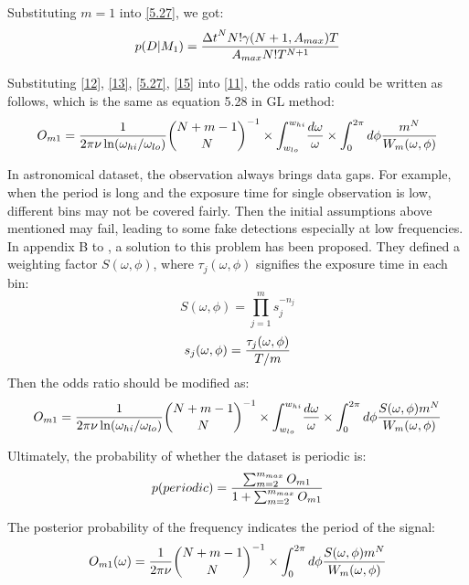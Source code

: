\documentclass[twoside,twocolumn]{aastex63}
\begin{document}
Substituting $m=1$ into \ref{5.27}, we got:
\begin{equation}\label{15}
p(D|M_1)={{{\Delta t}^N N!\gamma(N+1,A_{max})T}\over {A_{max}N!T^{N+1}}}
\end{equation}

Substituting \ref{12}, \ref{13}, \ref{5.27}, \ref{15} into \ref{11}, the odds ratio could be written as follows, which is the same as equation 5.28 in GL method:
\begin{equation}\label{A16}
O_{m1}={1\over{2\pi \nu \ln(\omega_{hi}/\omega_{lo})}} {{N+m-1}	\choose N}^{-1}\times {\int_{w_{lo}}^{w_{hi}}}{{d\omega}\over{\omega}}\times {\int_0^{2\pi}d\phi{m^N\over W_m(\omega,\phi)}} 
\end{equation}

In astronomical dataset, the observation always brings data gaps. For example, when the period is long and the exposure time for single observation is low, different bins may not be covered fairly. Then the initial assumptions above mentioned may fail, leading to some fake detections especially at low frequencies. In appendix B to \citep{1992ApJ...398..146G}, a solution to this problem has been proposed. They defined a weighting factor $S(\omega,\phi)$, where ${\tau_{j}(\omega,\phi)}$ signifies the exposure time in each bin:
\begin{equation}\label{A17}
S(\omega,\phi)={\prod_{j=1}^m s_j^{-n_j}}
\end{equation}
\begin{equation}
s_j(\omega,\phi)={{\tau_{j}(\omega,\phi)}\over {T/m}}
\end{equation}
\indent
Then the odds ratio should be modified as:
\begin{equation}\label{A19}
O_{m1}={1\over{2\pi \nu \ln(\omega_{hi}/\omega_{lo})}} {{N+m-1}	\choose N}^{-1}\times {\int_{w_{lo}}^{w_{hi}}}{{d\omega}\over{\omega}}\times {\int_0^{2\pi}d\phi{S(\omega,\phi)m^N\over W_m(\omega,\phi)}} 
\end{equation}

Ultimately, the probability of whether the dataset is periodic is:
\begin{equation}\label{A20}
p(periodic)={{\sum_{m=2}^{m_{max}} O_{m1}}\over {1+\sum_{m=2}^{m_{max}} O_{m1}}}
\end{equation}

The posterior probability of the frequency indicates the period of the signal:
\begin{equation}\label{A21}
O_{m1}(\omega)={1\over{2\pi \nu}} {{N+m-1}	\choose N}^{-1} \times {\int_0^{2\pi}d\phi{S(\omega,\phi)m^N\over W_m(\omega,\phi)}} 
\end{equation}
\end{document}
